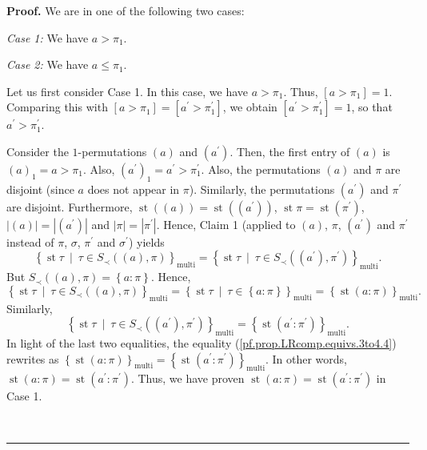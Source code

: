 \documentclass[numbers=enddot,12pt,final,onecolumn,notitlepage]{scrartcl}%
\theoremstyle{definition}
\newenvironment{proof}[1][Proof]{\noindent\textbf{#1.} }{\ \rule{0.5em}{0.5em}}
\newenvironment{verlong}{}{}
\begin{document}
\begin{verlong}
\begin{proof}
We are in one of the following two cases:

\textit{Case 1:} We have $a>\pi_{1}$.

\textit{Case 2:} We have $a\leq\pi_{1}$.

Let us first consider Case 1. In this case, we have $a>\pi_{1}$. Thus,
$\left[  a>\pi_{1}\right]  =1$. Comparing this with $\left[  a>\pi_{1}\right]
=\left[  a^{\prime}>\pi_{1}^{\prime}\right]  $, we obtain $\left[  a^{\prime
}>\pi_{1}^{\prime}\right]  =1$, so that $a^{\prime}>\pi_{1}^{\prime}$.

Consider the $1$-permutations $\left(  a\right)  $ and $\left(  a^{\prime
}\right)  $. Then, the first entry of $\left(  a\right)  $ is $\left(
a\right)  _{1}=a>\pi_{1}$. Also, $\left(  a^{\prime}\right)  _{1}=a^{\prime
}>\pi_{1}^{\prime}$. Also, the permutations $\left(  a\right)  $ and $\pi$ are
disjoint (since $a$ does not appear in $\pi$). Similarly, the permutations
$\left(  a^{\prime}\right)  $ and $\pi^{\prime}$ are disjoint. Furthermore,
$\operatorname{st}\left(  \left(  a\right)  \right)  =\operatorname{st}
\left(  \left(  a^{\prime}\right)  \right)  $, $\operatorname{st}
\pi  =\operatorname{st}\left(  \pi^{\prime}\right)  $, $\left\vert
\left(  a\right)  \right\vert =\left\vert \left(  a^{\prime}\right)
\right\vert $ and $\left\vert \pi\right\vert =\left\vert \pi^{\prime
}\right\vert $. Hence, Claim 1 (applied to $\left(  a\right)  $, $\pi$,
$\left(  a^{\prime}\right)  $ and $\pi^{\prime}$ instead of $\pi$, $\sigma$,
$\pi^{\prime}$ and $\sigma^{\prime}$) yields%
\begin{equation}
\left\{  \operatorname{st} \tau   \ \mid\ \tau\in S_{\prec
}\left(  \left(  a\right)  ,\pi\right)  \right\}  _{\operatorname*{multi}%
}=\left\{  \operatorname{st} \tau   \ \mid\ \tau\in S_{\prec
}\left(  \left(  a^{\prime}\right)  ,\pi^{\prime}\right)  \right\}
_{\operatorname*{multi}}. \label{pf.prop.LRcomp.equivs.3to4.4}%
\end{equation}
But $S_{\prec}\left(  \left(  a\right)  ,\pi\right)  =\left\{  a:\pi\right\}
$. Hence,%
\[
\left\{  \operatorname{st} \tau   \ \mid\ \tau\in S_{\prec
}\left(  \left(  a\right)  ,\pi\right)  \right\}  _{\operatorname*{multi}%
}=\left\{  \operatorname{st} \tau   \ \mid\ \tau\in\left\{
a:\pi\right\}  \right\}  _{\operatorname*{multi}}=\left\{  \operatorname{st}
\left(  a:\pi\right)  \right\}  _{\operatorname*{multi}}.
\]
Similarly,%
\[
\left\{  \operatorname{st} \tau   \ \mid\ \tau\in S_{\prec
}\left(  \left(  a^{\prime}\right)  ,\pi^{\prime}\right)  \right\}
_{\operatorname*{multi}}=\left\{  \operatorname{st}\left(  a^{\prime}%
:\pi^{\prime}\right)  \right\}  _{\operatorname*{multi}}.
\]
In light of the last two equalities, the equality
(\ref{pf.prop.LRcomp.equivs.3to4.4}) rewrites as $\left\{  \operatorname{st}
\left(  a:\pi\right)  \right\}  _{\operatorname*{multi}}=\left\{
\operatorname{st}\left(  a^{\prime}:\pi^{\prime}\right)  \right\}
_{\operatorname*{multi}}$. In other words, $\operatorname{st}\left(
a:\pi\right)  =\operatorname{st}\left(  a^{\prime}:\pi^{\prime}\right)  $.
Thus, we have proven $\operatorname{st}\left(  a:\pi\right)
=\operatorname{st}\left(  a^{\prime}:\pi^{\prime}\right)  $ in Case 1.


\end{proof}
\end{verlong}
\end{document}
